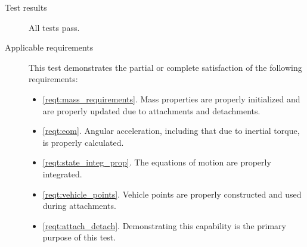 \begin{description}
\item[Test results]
All tests pass.

\item[Applicable requirements]
This test demonstrates the partial or complete satisfaction of the
following requirements:
\begin{itemize}
\item \ref{reqt:mass_requirements}. Mass properties are properly initialized and
are properly updated due to attachments and detachments.
\item \ref{reqt:eom}.
Angular acceleration, including that due to inertial torque, is properly
calculated.
\item \ref{reqt:state_integ_prop}. The equations of motion are properly
integrated.
\item \ref{reqt:vehicle_points}. Vehicle points are properly constructed
and used during attachments.
\item \ref{reqt:attach_detach}. Demonstrating this capability
is the primary purpose of this test.
\end{itemize}

\end{description}

